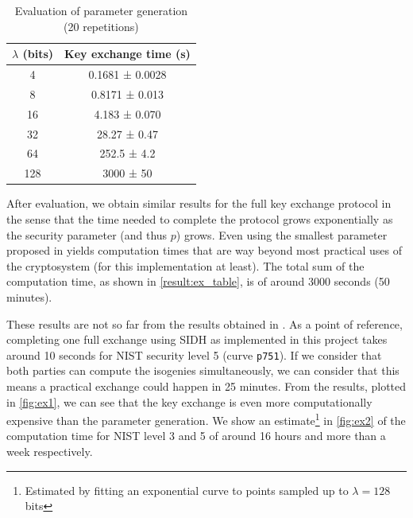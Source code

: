\documentclass[a4paper,11pt,oneside]{report}
\begin{document}
    \begin{table}[!h]
        \label{result:ex_table}
        \begin{center}
        \begin{tabular}{| c | c |}
        \hline
        \textbf{$\lambda$ (bits)} & \textbf{Key exchange time (s)}  \\ 
        \hline

        4 & 0.1681 ± 0.0028\\ \hline
        8 & 0.8171 ± 0.013\\ \hline
        16 & 4.183 ± 0.070\\ \hline
        32 & 28.27 ± 0.47\\ \hline
        64 & 252.5 ± 4.2\\ \hline
        128 & 3000 ± 50\\ \hline
        \hline
        \end{tabular}
        \end{center}
        \caption{Evaluation of parameter generation (20 repetitions)}
    \end{table}

    After evaluation, we obtain similar results for the full key exchange protocol in the sense that the time needed to complete the protocol grows exponentially as the security parameter (and thus $p$) grows. Even using the smallest parameter proposed in \cite{msidh} yields computation times that are way beyond most practical uses of the cryptosystem (for this implementation at least). The total sum of the computation time, as shown in \autoref{result:ex_table}, is of around 3000 seconds (50 minutes). 
    
    
    
    These results are not so far from the results obtained in \cite{compression}. As a point of reference, completing one full exchange using SIDH as implemented in this project takes around 10 seconds for NIST security level 5 (curve \texttt{p751}). If we consider that both parties can compute the isogenies simultaneously, we can consider that this means a practical exchange could happen in 25 minutes. From the results, plotted in \autoref{fig:ex1}, we can see that the key exchange is even more computationally expensive than the parameter generation. We show an estimate\footnote{Estimated by fitting an exponential curve to points sampled up to $\lambda = 128$ bits} in \autoref{fig:ex2} of the computation time for NIST level 3 and 5 of around 16 hours and more than a week respectively. 
    
\end{document}
